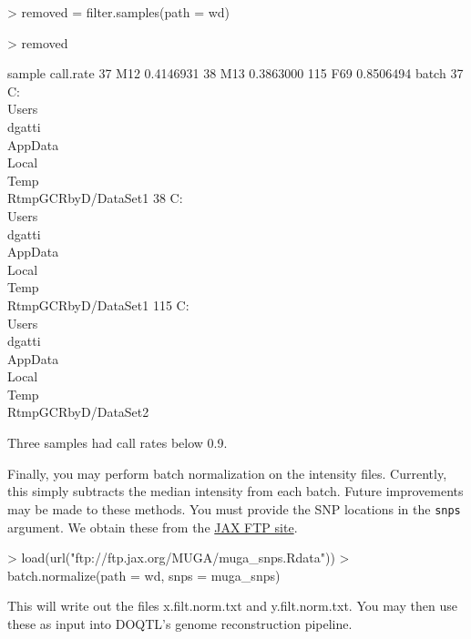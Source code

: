\documentclass{article}
\begin{document}
\begin{Schunk}
\begin{Sinput}
> removed = filter.samples(path = wd)
\end{Sinput}
\end{Schunk}
\begin{Schunk}
\begin{Sinput}
> removed
\end{Sinput}
\begin{Soutput}
    sample call.rate
37     M12 0.4146931
38     M13 0.3863000
115    F69 0.8506494
                                                           batch
37  C:\\Users\\dgatti\\AppData\\Local\\Temp\\RtmpGCRbyD/DataSet1
38  C:\\Users\\dgatti\\AppData\\Local\\Temp\\RtmpGCRbyD/DataSet1
115 C:\\Users\\dgatti\\AppData\\Local\\Temp\\RtmpGCRbyD/DataSet2
\end{Soutput}
\end{Schunk}

Three samples had call rates below 0.9.

\vspace{5 mm}

Finally, you may perform batch normalization on the intensity files. Currently, this simply subtracts the median intensity from each batch. Future improvements may be made to these methods. You must provide the SNP locations in the \texttt{snps} argument. We obtain these from the \href{ftp://ftp.jax.org/MUGA/}{JAX FTP site}.

\begin{Schunk}
\begin{Sinput}
> load(url("ftp://ftp.jax.org/MUGA/muga_snps.Rdata"))
> batch.normalize(path = wd, snps = muga_snps)
\end{Sinput}
\end{Schunk}

This will write out the files x.filt.norm.txt and  y.filt.norm.txt.  You may then use these as input into DOQTL's genome reconstruction pipeline.
\end{document}
